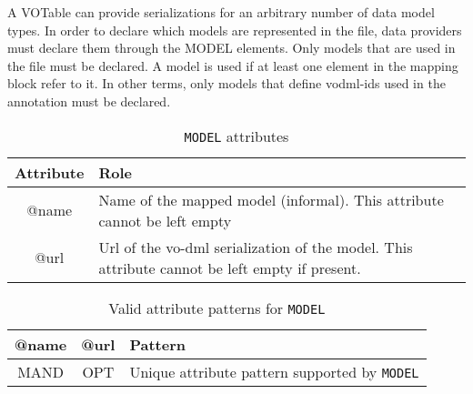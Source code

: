 A VOTable can provide serializations for an arbitrary number of data model
types. In order to declare which models are represented in the file, data
providers must declare them through the MODEL elements.
Only models that are used in the file must be declared. A model is
used if at least one element in the mapping block refer to it. In other terms, only models that define vodml-ids used in the
annotation must be declared.
\begin{table}[!htbp]
\small
\centering
\begin{tabulary}{\linewidth}{|c|J|}       
       \hline 
            \textbf{Attribute} & 
            \textbf {Role}\\
       \hline         \hline  
            @name  & 
            Name of the mapped model (informal).  This attribute cannot be left empty  \\
       \hline 
            @url & 
            Url of the vo-dml serialization of the model. This attribute cannot be left empty if present.\\
       \hline 
     \end{tabulary}
     \caption{\texttt{MODEL} attributes} 
     \label{tbl:model-att}
 \end{table}


\begin{table}[!htbp]
\small
\centering
\begin{tabulary}{\linewidth}{|c |c |J|}
    \hline 
        \textbf{@name} &
        \textbf{@url} &
        \textbf{Pattern}\\
    \hline      \hline  
        MAND &           
        OPT &           
        Unique attribute pattern supported by \texttt{MODEL}\\
   \hline 
\end{tabulary}
     \caption{Valid attribute patterns for  \texttt{MODEL}} 
     \label{tbl:model-pattern}
 \end{table}